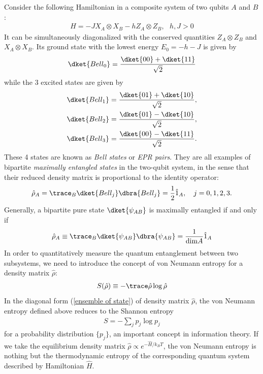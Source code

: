 Consider the following Hamiltonian in a composite system of two qubits $A$ and $B$:
\begin{align}
H=-JX_A\otimes X_B-hZ_A\otimes Z_B,~~~h,J>0
\end{align}
It can be simultaneously diagonalized with the conserved quantities $Z_A\otimes Z_B$ and $X_A\otimes X_B$. Its ground state with the lowest energy $E_0=-h-J$ is given by
\begin{align}
\dket{Bell_0}=\frac{\dket{00}+\dket{11}}{\sqrt2}
\end{align}
while the 3 excited states are given by
\begin{align}
&\dket{Bell_1}=\frac{\dket{01}+\dket{10}}{\sqrt2},\\
&\dket{Bell_2}=\frac{\dket{01}-\dket{10}}{\sqrt2},\\
&\dket{Bell_3}=\frac{\dket{00}-\dket{11}}{\sqrt2}.
\end{align}
These 4 states are known as \emph{Bell states} or \emph{EPR pairs}. They are all examples of bipartite \emph{maximally entangled states} in the two-qubit system, in the sense that their reduced density matrix is proportional to the identity operator:
\begin{align}
\hat\rho_A=\trace_B\dket{Bell_j}\dbra{Bell_j}=\frac12\hat 1_A,~~~j=0,1,2,3.
\end{align}
Generally, a bipartite pure state $\dket{\psi_{AB}}$ is maximally entangled if and only if
\begin{align}\label{maximally entangled state}
\hat\rho_A\equiv\trace_B\dket{\psi_{AB}}\dbra{\psi_{AB}}=\frac1{\text{dim} A}\hat 1_A
\end{align}
In order to quantitatively measure the quantum entanglement between two subsystems, we need to introduce the concept of von Neumann entropy for a density matrix $\hat\rho$:
\begin{align}
S(\hat\rho)\equiv-\trace\hat\rho\log\hat\rho
\end{align}
In the diagonal form (\ref{ensemble of state}) of density matrix $\hat\rho$, the von Neumann entropy defined above reduces to the Shannon entropy 
\begin{align}
S=-\sum_jp_j\log p_j
\end{align}
for a probability distribution $\{p_j\}$, an important concept in information theory. If we take the equilibrium density matrix $\hat\rho\propto e^{-\hat H/k_BT}$, the von Neumann entropy is nothing but the thermodynamic entropy of the corresponding quantum system described by Hamiltonian $\hat H$. 


